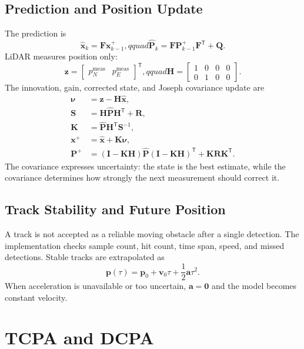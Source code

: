 \documentclass[11pt,a4paper]{article}
\begin{document}


\subsection{Prediction and Position Update}
The prediction is
\[
\hat{\bm{x}}_k=\bm{F}\bm{x}_{k-1}^{+},qquad
\hat{\bm{P}}_k=\bm{F}\bm{P}_{k-1}^{+}\bm{F}^{\mathsf T}+\bm{Q}.
\]
LiDAR measures position only:
\[
\bm{z}=\begin{bmatrix}p_N^{\mathrm{meas}}&p_E^{\mathrm{meas}}\end{bmatrix}^{\mathsf T},qquad
\bm{H}=\begin{bmatrix}1&0&0&0\\0&1&0&0\end{bmatrix}.
\]
The innovation, gain, corrected state, and Joseph covariance update are
\begin{align}
\bm{\nu}&=\bm{z}-\bm{H}\hat{\bm{x}},\\
\bm{S}&=\bm{H}\hat{\bm{P}}\bm{H}^{\mathsf T}+\bm{R},\\
\bm{K}&=\hat{\bm{P}}\bm{H}^{\mathsf T}\bm{S}^{-1},\\
\bm{x}^{+}&=\hat{\bm{x}}+\bm{K}\bm{\nu},\\
\bm{P}^{+}&=(\bm{I}-\bm{K}\bm{H})\hat{\bm{P}}(\bm{I}-\bm{K}\bm{H})^{\mathsf T}+\bm{K}\bm{R}\bm{K}^{\mathsf T}.
\end{align}
The covariance expresses uncertainty: the state is the best estimate, while the covariance determines how strongly the next measurement should correct it.



\subsection{Track Stability and Future Position}
A track is not accepted as a reliable moving obstacle after a single detection. The implementation checks sample count, hit count, time span, speed, and missed detections. Stable tracks are extrapolated as
\[
\bm{p}(\tau)=\bm{p}_0+\bm{v}_0\tau+\frac12\bm{a}\tau^2.
\]
When acceleration is unavailable or too uncertain, \(\bm{a}=\bm{0}\) and the model becomes constant velocity.




\section{TCPA and DCPA}
\end{document}
